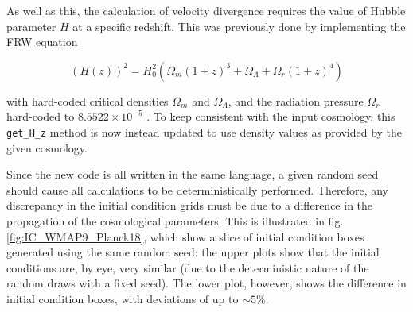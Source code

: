 \documentclass[floats,floatfix,showpacs,amssymb,prd,superscriptaddress,nofootinbib]{revtex4-2} %
\newcommand{\code}{\texttt}
\begin{document}
As well as this, the calculation of velocity divergence requires the value of Hubble parameter $H$ at a specific redshift. This was previously done by implementing the FRW equation

\begin{equation}
    (H(z))^2 = H_0^2 (\Omega_m (1 + z)^3 + \Omega_\Lambda + \Omega_r (1+z)^4)
\end{equation}

\noindent with hard-coded critical densities $\Omega_m$ and $\Omega_\Lambda$, and the radiation pressure $\Omega_r$ hard-coded to $8.5522 \times 10^{-5}$ \citep{Planck2013results}. To keep consistent with the input cosmology, this \code{get\_H\_z} method is now instead updated to use density values as provided by the given cosmology.


Since the new code is all written in the same language, a given random seed should cause all calculations to be deterministically performed. Therefore, any discrepancy in the initial condition grids must be due to a difference in the propagation of the cosmological parameters. This is illustrated in fig. \ref{fig:IC_WMAP9_Planck18}, which show a slice of initial condition boxes generated using the same random seed: the upper plots show that the initial conditions are, by eye, very similar (due to the deterministic nature of the random draws with a fixed seed). The lower plot, however, shows the difference in initial condition boxes, with deviations of up to $\sim 5 \%$.
\end{document}
